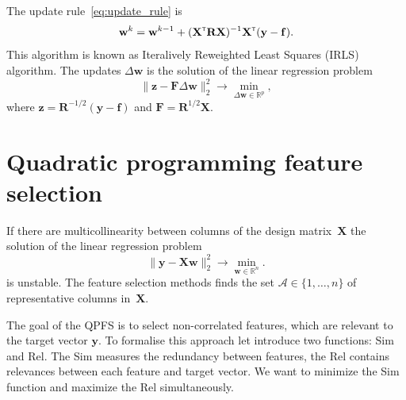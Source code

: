 \documentclass[a4paper,12pt]{article}
\theoremstyle{plain} %
\theoremstyle{definition} %
\theoremstyle{remark} %
\newcommand{\bw}{\mathbf{w}}
\newcommand{\by}{\mathbf{y}}
\newcommand{\bz}{\mathbf{z}}
\newcommand{\cA}{\mathcal{A}}
\newcommand{\bbR}{\mathbb{R}}
\newcommand{\bF}{\mathbf{F}}
\newcommand{\bR}{\mathbf{R}}
\newcommand{\bX}{\mathbf{X}}
\newcommand{\T}{{\text{\tiny\sffamily\upshape\mdseries T}}}
\begin{document}
	The update rule~\eqref{eq:update_rule} is
	\[
		\bw^k = \bw^{k - 1} + (\bX^{\T} \bR \bX)^{-1} \bX^{\T} (\by - \mathbf{f}).
	\]
	This algorithm is known as Iteralively Reweighted Least Squares (IRLS) algorithm. The updates $\Delta \bw$ is the solution of the linear regression problem
	\begin{equation}
		\| \bz - \bF \Delta \bw \|_2^2 \rightarrow \min_{\Delta \bw \in \bbR^{p}},
		\label{eq:lin_reg_log_reg}
	\end{equation}
where $\bz = \bR^{-1/2} (\by - \mathbf{f})$ and $\bF = \bR^{1/2}\bX$.
	
	\section*{Quadratic programming feature selection}
	If there are multicollinearity between columns of the design matrix~$\bX$ the solution of the linear regression problem
	\begin{equation}
	\| \by - \bX \bw\|_2^2 \rightarrow\min_{\bw \in \bbR^{n}}.
	\label{eq:linear_regression}
	\end{equation}
	is unstable. The feature selection methods finds the set $\cA \in \{1, \dots, n\}$ of representative columns in~$\bX$. 
	
	The goal of the QPFS is to select non-correlated features, which are relevant to the target vector $\by$.
	To formalise this approach let introduce two functions: Sim and Rel. 
	The Sim measures the redundancy between features, the Rel contains relevances between each feature and target vector. 
	We want to minimize the Sim function and maximize the Rel simultaneously.
	
\end{document}
